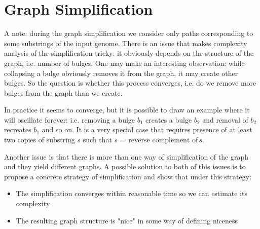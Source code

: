 \documentclass[a4paper, 12pt]{scrartcl}
\begin{document}
\pagebreak

\section{Graph Simplification}
A note: during the graph simplification we consider only paths corresponding to some substrings of the input genome.
There is an issue that makes complexity analysis of the simplification tricky: it obviously depends on the structure of the graph, i.e. number of bulges.
One may make an interesting observation: while collapsing a bulge obviously removes it from the graph, it may create other bulges.
So the question is whether this process converges, i.e. do we remove more bulges from the graph than we create.

In practice it seems to converge, but it is possible to draw an example where it will oscillate forever: i.e. removing a bulge $b_1$ creates a bulge $b_2$ and removal of $b_2$ recreates $b_1$ and so on.
It is a very special case that requires presence of at least two copies of substring $s$ such that $s = \, \text{reverse complement of} \, s$.

Another issue is that there is more than one way of simplification of the graph and they yield different graphs.
A possible solution to both of this issues is to propose a concrete strategy of simplification and show that under this strategy:
\begin{itemize}
\item The simplification converges within reasonable time so we can estimate its complexity
\item The resulting graph structure is "nice" in some way of defining niceness
\end{itemize}
\end{document}
